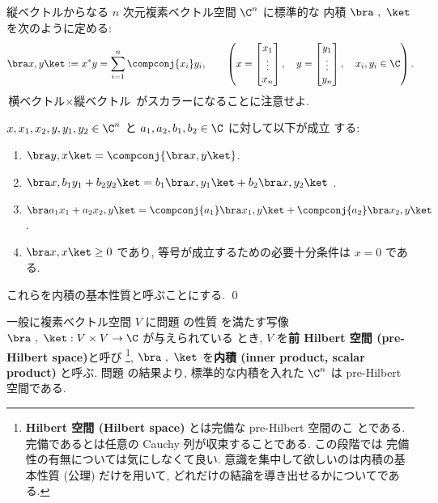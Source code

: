 \documentclass[12pt,twoside]{jarticle}
\begin{document}

縦ベクトルからなる $n$ 次元複素ベクトル空間 $\C^n$ に標準的な
内積 $\bra\ ,\ \ket$ を次のように定める:
\begin{equation*}
  \bra x, y \ket := x^* y = \sum_{i=1}^n \compconj{x_i}y_i,
  \qquad
  \left(
  x =
  \begin{bmatrix}
    x_1 \\ \vdots \\ x_n
  \end{bmatrix},
  \quad
  y =
  \begin{bmatrix}
    y_1 \\ \vdots \\ y_n
  \end{bmatrix},
  \quad
  x_i, y_i\in\C
  \right).
\end{equation*}
$\text{横ベクトル}\times\text{縦ベクトル}$ がスカラーになることに注意せよ.


\begin{question}[内積の基本性質, 5点]
\label{q:inner-prod-axioms}
  $x,x_1,x_2,y,y_1,y_2\in\C^n$ と $a_1,a_2,b_1,b_2\in\C$ に対して以下が成立
  する: 
  \begin{enumerate}
  \item $\bra y, x\ket = \compconj{\bra x, y\ket}$.
  \item $\bra x, b_1y_1+b_2y_2\ket
    = b_1\bra x, y_1\ket + b_2\bra x, y_2\ket$
    .
  \item $\bra a_1x_1+a_2x_2, y\ket
    = \compconj{a_1}\bra x_1, y\ket + \compconj{a_2}\bra x_2, y\ket$
    .
  \item $\bra x, x\ket \ge 0$ であり,
    等号が成立するための必要十分条件は $x=0$ である. 
  \end{enumerate}
  これらを内積の基本性質と呼ぶことにする. 
  \qed
\end{question}


一般に複素ベクトル空間 $V$ に問題  の性質
を満たす写像 $\bra\ ,\ \ket:V\times V\to\C$ が与えられている
とき, $V$ を{\bf 前 Hilbert 空間 (pre-Hilbert space)}と呼び%
\footnote{{\bf Hilbert 空間 (Hilbert space)} とは完備な pre-Hilbert 空間のこ
  とである. 完備であるとは任意の Cauchy 列が収束することである. この段階では
  完備性の有無については気にしなくて良い.  意識を集中して欲しいのは内積の基
  本性質 (公理) だけを用いて, どれだけの結論を導き出せるかについてである.}, %
$\bra\ ,\ \ket$ を{\bf 内積 (inner product, scalar product)} と呼ぶ.
問題  の結果より, 
標準的な内積を入れた $\C^n$ は pre-Hilbert 空間である.
\end{document}
